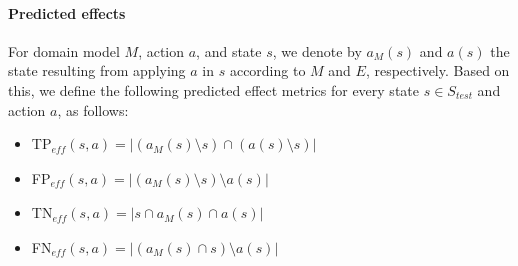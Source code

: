 \documentclass[letterpaper]{article} %
\newcommand{\eff}{\ensuremath{\textit{eff}}\xspace}
\newcommand{\stest}{\ensuremath{S_{\textit{test}}}\xspace}
\begin{document}
\paragraph{Predicted effects}
For domain model $M$, action $a$, and state $s$, we denote by $a_M(s)$ and $a(s)$ the state resulting from applying $a$ in $s$ according to $M$ and $E$, respectively. 
Based on this, we define the following predicted effect metrics for every state $s\in\stest$ and action $a$, as follows: 
\begin{itemize}
    \item TP$_{\eff}(s,a)=|(a_M(s)\setminus s)\cap (a(s)\setminus s)|$
    \item FP$_{\eff}(s,a)=|(a_M(s)\setminus s)\setminus a(s)|$ 
    \item TN$_{\eff}(s,a)=|s \cap a_M(s) \cap a(s)|$
    \item FN$_{\eff}(s,a)=|(a_M(s)\cap s)\setminus a(s)|$ 
\end{itemize}
\end{document}
